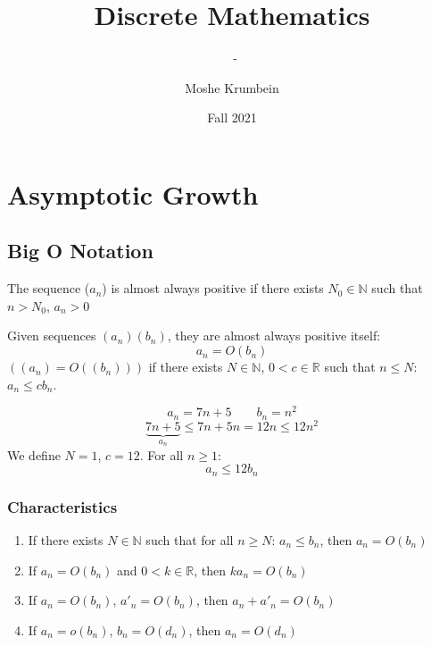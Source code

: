 \documentclass[00_complete]{subfiles}
\title{Discrete Mathematics}
\author{Moshe Krumbein}
\date{Fall 2021}
\begin{document}
\setcounter{chapter}{9}

\chapter{Asymptotic Growth}
\subtitle{\theauthor~- \thedate}

\section{Big O Notation}
\begin{definition}
    The sequence ($a_n$) is almost always positive if there exists $N_0\in
    \mathbb{N}$ such that $n>N_0$, $a_n>0$
\end{definition}
\begin{definition}
    Given sequences $(a_n)(b_n)$, they are almost always positive itself:
    $$a_n=O(b_n)$$
    $((a_n)=O((b_n)))$ if there exists $N \in \mathbb{N}$, $0 <c \in
    \mathbb{R}$ such that $n \leq N$: $a_n \leq cb_n$.
\end{definition}
\begin{example}
    $$a_n=7n+5 \qquad b_n=n^2$$
    $$\underbrace{7n+5}_{a_n} \leq 7n+5n = 12n \leq 12n^2$$
    We define $N=1$, $c=12$. For all $n\geq 1$:
    $$a_n \leq 12b_n$$
\end{example}
\subsection{Characteristics}
\begin{enumerate}
    \item If there exists $N \in \mathbb{N}$ such that for all $n \geq N$: $a_n
        \leq b_n$, then $a_n = O(b_n)$
    \item If $a_n = O(b_n)$ and $0 < k \in \mathbb{R}$, then $ka_n=O(b_n)$
    \item If $a_n=O(b_n)$, $a'_n=O(b_n)$, then $a_n+a'_n=O(b_n)$
    \item If $a_n=o(b_n)$, $b_n=O(d_n)$, then $a_n = O(d_n)$
\end{enumerate}
\end{document}

